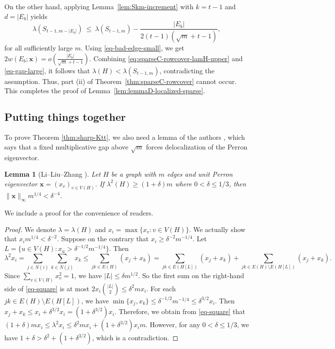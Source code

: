 \documentclass[10pt,a4paper]{amsart}
\newtheorem{lemma}[theorem]{Lemma}
\begin{document}
On the other hand, applying Lemma~\ref{lem:Skm-increment} with $k=t-1$ and $d=|E_b|$ yields
\begin{equation} \label{eq-gap-large}
      \lambda(S_{t-1,m-|E_b|})
  \ \le\
  \lambda(S_{t-1,m})-\frac{|E_b|}{2(t-1)(\sqrt{m}+t-1)}, 
\end{equation} 
for all sufficiently large $m$.
Using \eqref{eq-bad-edge-small}, we get $2w(E_b; \bm{x})
        =
        o\!\left(\frac{|E_b|}{\sqrt{m}+t-1}\right).$
Combining \eqref{eq:sparseC-rowcover-lamH-upper} and \eqref{eq-gap-large}, it follows that $\lambda(H)<\lambda(S_{t-1,m})$, contradicting the assumption. Thus,  part \textup{(ii)} of Theorem~\ref{thm:sparseC-rowcover} cannot occur.  This completes the proof of Lemma~\ref{lem:lemmaD-localized-sparse}.


\subsection{Putting things together}

To prove Theorem \ref{thm:sharp-Ktt}, we also need a lemma of the authors \cite[Lemma 2.3]{LiLiuZhang2025EdgeSpectralESS}, which says that a fixed multiplicative gap above \(\sqrt m\) forces delocalization of the Perron eigenvector. 

\begin{lemma}[Li--Liu--Zhang \cite{LiLiuZhang2025EdgeSpectralESS}] \label{lem:max} 
Let $H$ be a graph with $m$ edges and unit Perron eigenvector \(\bm{x}=(x_v)_{v\in V(H)}\).  
 If $\lambda^2 (H) \ge (1+\delta)m$ where $0<\delta \le 1/3$, then 
$\|\bm{x}\|_{\infty} m^{1/4} < \delta^{-4}$.  
\end{lemma}

We include a proof for the convenience of readers. 

\begin{proof} 
    We denote $\lambda = \lambda(H)$ and 
    $x_i=\max\{x_v: v\in V(H)\}$. 
   We actually show that $x_i m^{1/4} < \delta^{-2}$. 
    Suppose on the contrary that $x_i \ge \delta^{-2}m^{-1/4}$. Let $L=\{u\in V(H): x_u > \delta^{-1/2}m^{-1/4}\}.$
     Then 
    \begin{equation} \label{eq-square}
        \lambda^2x_i
        =
        \sum_{j\in N(i)} \sum_{k\in N(j)} x_k 
        \le
        \sum_{jk\in E(H)} (x_j +x_k) 
        =
        \sum_{jk\in E(H[L])} (x_j+x_k) 
        +
        \sum_{jk\in E(H)\setminus E(H[L])} (x_j+x_k).
    \end{equation}
   Since $\sum_{v\in V(H)}x_v^2=1$, we have 
    $|L|\le \delta m^{1/2}$. So the first sum on the right-hand side of \eqref{eq-square} is at most $2x_i\binom{|L|}{2}\le \delta^2 mx_i.$
    For each $jk\in E(H)\setminus E(H[L])$, 
    we have $\min\{x_j,x_k\}\le \delta^{-1/2}m^{-1/4} \le \delta^{3/2}x_i$. 
    Then $x_j +x_k \le x_i + \delta^{3/2}x_i= 
        (1+ \delta^{3/2})x_i.$
    Therefore, we obtain from \eqref{eq-square} that $(1+\delta)m x_i
        \le
        \lambda^2 x_i
        \le 
        \delta^2 mx_i + (1+ \delta^{3/2})x_im.$
    However, for any $0< \delta \le 1/3$, we have 
    $1+ \delta > \delta^2 + (1+ \delta^{3/2})$, which is a contradiction. 
\end{proof}
\end{document}

